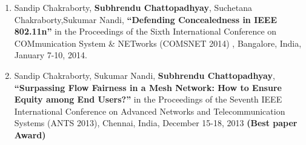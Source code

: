 \documentclass{res}
\newcommand{\papertitle}[1]{\textbf{ ``#1''}}
\newcommand{\authorMe}{{\bf Subhrendu Chattopadhyay}}
\begin{document}
\begin{resume}
\begin{enumerate}
		\item Sandip Chakraborty, \authorMe, Suchetana Chakraborty,Sukumar Nandi,  \papertitle{Defending Concealedness in IEEE 802.11n}  in the Proceedings of the Sixth International Conference on COMmunication System \& NETworks (COMSNET 2014) , Bangalore, India, January 7-10, 2014.
		\item Sandip Chakraborty, Sukumar Nandi, \authorMe, \papertitle{Surpassing Flow Fairness in a Mesh Network: How to Ensure Equity among End Users?}  in the Proceedings of the Seventh IEEE International Conference on Advanced Networks and Telecommunication Systems (ANTS 2013), Chennai, India, December 15-18, 2013 {\bf (Best paper Award)} 
	\end{enumerate}        
\end{resume}
\end{document}
